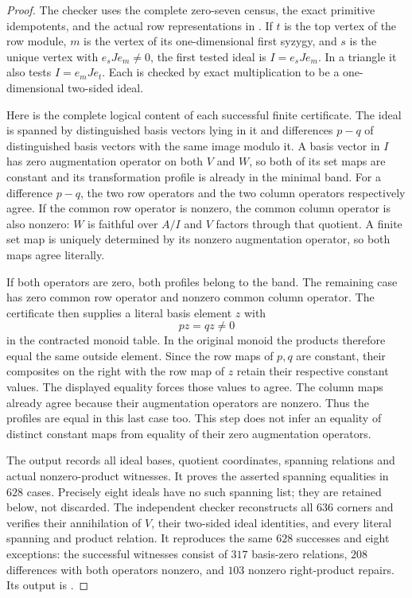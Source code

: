 \begin{proof}
The checker  uses the
complete zero-seven census, the exact primitive idempotents,
and the actual row representations in
.
If $t$ is the top vertex of the row module, $m$ is the vertex
of its one-dimensional first syzygy, and $s$ is the unique
vertex with $e_sJe_m\ne0$, the first tested ideal is
$I=e_sJe_m$.  In a triangle it also tests $I=e_mJe_t$.
Each is checked by exact multiplication to be a one-dimensional
two-sided ideal.

Here is the complete logical content of each successful finite
certificate.  The ideal is spanned by distinguished basis vectors
lying in it and differences $p-q$ of distinguished basis vectors
with the same image modulo it.  A basis vector in $I$ has zero
augmentation operator on both $V$ and $W$, so both of its set
maps are constant and its transformation profile is already in
the minimal band.  For a difference $p-q$, the two row operators
and the two column operators respectively agree.  If the common
row operator is nonzero, the common column operator is also
nonzero: $W$ is faithful over $A/I$ and $V$ factors through that
quotient.  A finite set map is uniquely determined by its nonzero
augmentation operator, so both maps agree literally.

If both operators are zero, both profiles belong to the band.
The remaining case has zero common row operator and nonzero
common column operator.  The certificate then supplies a literal
basis element $z$ with
\[
 pz=qz\ne0
\]
in the contracted monoid table.  In the original monoid the
products therefore equal the same outside element.  Since the
row maps of $p,q$ are constant, their composites on the right
with the row map of $z$ retain their respective constant values.
The displayed equality forces those values to agree.  The column
maps already agree because their augmentation operators are
nonzero.  Thus the profiles are equal in this last case too.
This step does not infer an equality of distinct constant maps
from equality of their zero augmentation operators.

The output
 records all
ideal bases, quotient coordinates, spanning relations and actual
nonzero-product witnesses.  It proves the asserted spanning
equalities in $628$ cases.  Precisely eight ideals have no such
spanning list; they are retained below, not discarded.
The independent checker
 reconstructs all
$636$ corners and verifies their annihilation of $V$, their
two-sided ideal identities, and every literal spanning and
product relation.  It reproduces the same $628$ successes and
eight exceptions: the successful witnesses consist of $317$
basis-zero relations, $208$ differences with both operators
nonzero, and $103$ nonzero right-product repairs.  Its output is
.


\end{proof}
